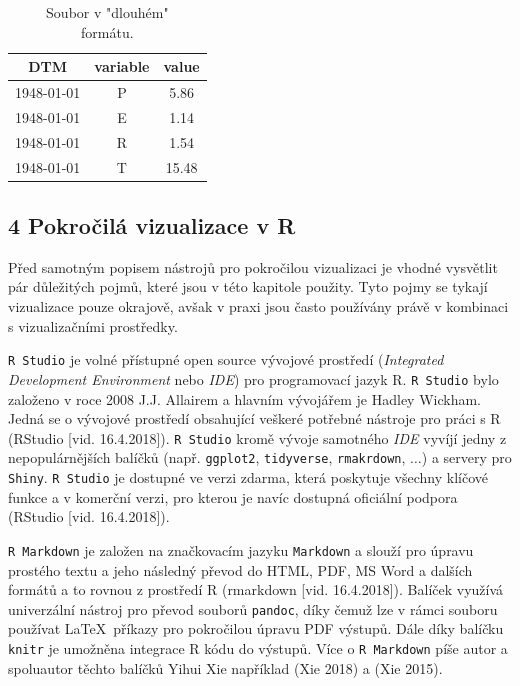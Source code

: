 \documentclass[12pt,]{article}
\begin{document}
\begin{minipage}[c]{0.39\textwidth}
\begin{table}[H]
\begin{tabular}{|ccc|}
  \hline
DTM & variable & value \\ 
  \hline
1948-01-01 & P & 5.86 \\ 
1948-01-01 & E & 1.14 \\ 
1948-01-01 & R & 1.54 \\ 
1948-01-01 & T & 15.48 \\ 
   \hline
\end{tabular}
\caption{Soubor v "dlouhém" \\ formátu.}
\label{tab4}
\end{table}
\end{minipage}

\newpage

\hypertarget{pokrocila}{\subsection{4 Pokročilá vizualizace v
R}\label{pokrocila}}

\qquad Před samotným popisem nástrojů pro pokročilou vizualizaci je
vhodné vysvětlit pár důležitých pojmů, které jsou v této kapitole
použity. Tyto pojmy se tykají vizualizace pouze okrajově, avšak v praxi
jsou často používány právě v kombinaci s vizualizačními prostředky.

\qquad \texttt{R\ Studio} je volné přístupné open source vývojové
prostředí (\emph{Integrated Development Environment} nebo \emph{IDE})
pro programovací jazyk R. \texttt{R\ Studio} bylo založeno v roce 2008
J.J. Allairem a hlavním vývojářem je Hadley Wickham. Jedná se o vývojové
prostředí obsahující veškeré potřebné nástroje pro práci s R (RStudio
{[}vid. 16.4.2018{]}). \texttt{R\ Studio} kromě vývoje samotného
\emph{IDE} vyvíjí jedny z nepopulárnějších balíčků (např.
\texttt{ggplot2}, \texttt{tidyverse}, \texttt{rmakrdown}, \(\dots\)) a
servery pro \texttt{Shiny}. \texttt{R\ Studio} je dostupné ve verzi
zdarma, která poskytuje všechny klíčové funkce a v komerční verzi, pro
kterou je navíc dostupná oficiální podpora (RStudio {[}vid.
16.4.2018{]}).

\qquad \texttt{R\ Markdown} je založen na značkovacím jazyku
\texttt{Markdown} a slouží pro úpravu prostého textu a jeho následný
převod do HTML, PDF, MS Word a dalších formátů a to rovnou z prostředí R
(rmarkdown {[}vid. 16.4.2018{]}). Balíček využívá univerzální nástroj
pro převod souborů \texttt{pandoc}, díky čemuž lze v rámci souboru
používat \LaTeX ~příkazy pro pokročilou úpravu PDF výstupů. Dále díky
balíčku \texttt{knitr} je umožněna integrace R kódu do výstupů. Více o
\texttt{R\ Markdown} píše autor a spoluautor těchto balíčků Yihui Xie
například (Xie 2018) a (Xie 2015).
\end{document}
